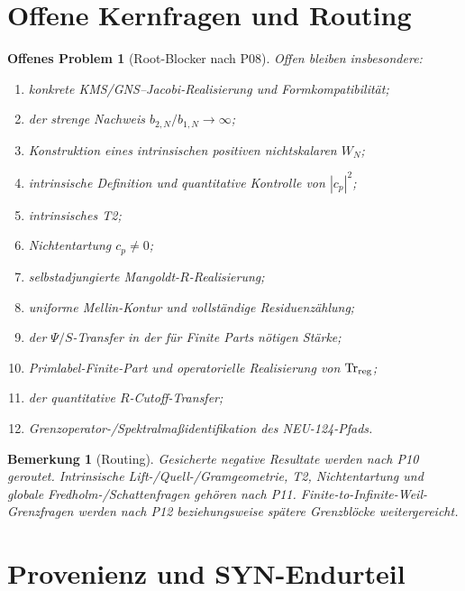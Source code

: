 \documentclass[11pt,a4paper]{amsart}
\newtheorem{remark}[theorem]{Bemerkung}
\newtheorem{openproblem}[theorem]{Offenes Problem}
\newcommand{\Tr}{\operatorname{Tr}}
\begin{document}
\section{Offene Kernfragen und Routing}

\begin{openproblem}[Root-Blocker nach P08]\label{op:root-blockers}
Offen bleiben insbesondere:
\begin{enumerate}
  \item konkrete KMS/GNS--Jacobi-Realisierung und Formkompatibilität;
  \item der strenge Nachweis $b_{2,N}/b_{1,N}\to\infty$;
  \item Konstruktion eines intrinsischen positiven nichtskalaren $W_N$;
  \item intrinsische Definition und quantitative Kontrolle von $|c_p|^2$;
  \item intrinsisches T2;
  \item Nichtentartung $c_p\ne0$;
  \item selbstadjungierte Mangoldt-$R$-Realisierung;
  \item uniforme Mellin-Kontur und vollständige Residuenzählung;
  \item der $\Psi/S$-Transfer in der für Finite Parts nötigen Stärke;
  \item Primlabel-Finite-Part und operatorielle Realisierung von $\Tr_{\rm reg}$;
  \item der quantitative $R$-Cutoff-Transfer;
  \item Grenzoperator-/Spektralmaßidentifikation des NEU-124-Pfads.
\end{enumerate}
\end{openproblem}

\begin{remark}[Routing]\label{rem:routing}
Gesicherte negative Resultate werden nach P10 geroutet. Intrinsische
Lift-/Quell-/Gramgeometrie, T2, Nichtentartung und globale
Fredholm-/Schattenfragen gehören nach P11. Finite-to-Infinite-Weil-Grenzfragen
werden nach P12 beziehungsweise spätere Grenzblöcke weitergereicht.
\end{remark}

\section{Provenienz und SYN-Endurteil}
\end{document}
